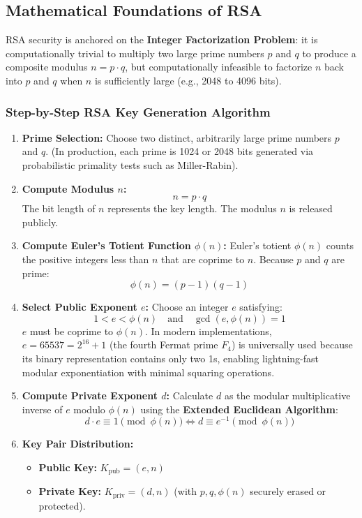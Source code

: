 \subsection{Mathematical Foundations of RSA}

RSA security is anchored on the \textbf{Integer Factorization Problem}: it is computationally trivial to multiply two large prime numbers $p$ and $q$ to produce a composite modulus $n = p \cdot q$, but computationally infeasible to factorize $n$ back into $p$ and $q$ when $n$ is sufficiently large (e.g., 2048 to 4096 bits).

\subsubsection{Step-by-Step RSA Key Generation Algorithm}

\begin{enumerate}
\item \textbf{Prime Selection:} Choose two distinct, arbitrarily large prime numbers $p$ and $q$. (In production, each prime is 1024 or 2048 bits generated via probabilistic primality tests such as Miller-Rabin).
\item \textbf{Compute Modulus $n$:}
\[ n = p \cdot q \]
The bit length of $n$ represents the key length. The modulus $n$ is released publicly.
\item \textbf{Compute Euler's Totient Function $\phi(n)$:}
Euler's totient $\phi(n)$ counts the positive integers less than $n$ that are coprime to $n$. Because $p$ and $q$ are prime:
\[ \phi(n) = (p - 1)(q - 1) \]
\item \textbf{Select Public Exponent $e$:}
Choose an integer $e$ satisfying:
\[ 1 < e < \phi(n) \quad \text{and} \quad \gcd(e, \phi(n)) = 1 \]
$e$ must be coprime to $\phi(n)$. In modern implementations, $e = 65537 = 2^{16} + 1$ (the fourth Fermat prime $F_4$) is universally used because its binary representation contains only two 1s, enabling lightning-fast modular exponentiation with minimal squaring operations.
\item \textbf{Compute Private Exponent $d$:}
Calculate $d$ as the modular multiplicative inverse of $e$ modulo $\phi(n)$ using the \textbf{Extended Euclidean Algorithm}:
\[ d \cdot e \equiv 1 \pmod{\phi(n)} \iff d \equiv e^{-1} \pmod{\phi(n)} \]
\item \textbf{Key Pair Distribution:}
\begin{itemize}
\item \textbf{Public Key:} $K_{\text{pub}} = (e, n)$
\item \textbf{Private Key:} $K_{\text{priv}} = (d, n)$ (with $p, q, \phi(n)$ securely erased or protected).
\end{itemize}
\end{enumerate}


